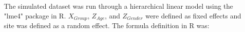 The simulated dataset was run through a hierarchical linear model using the "lme4" package in R. $X_{Group}$, $Z_{Age}$, and $Z_{Gender}$ were defined as fixed effects and site was defined as a random effect. The formula definition in R was: